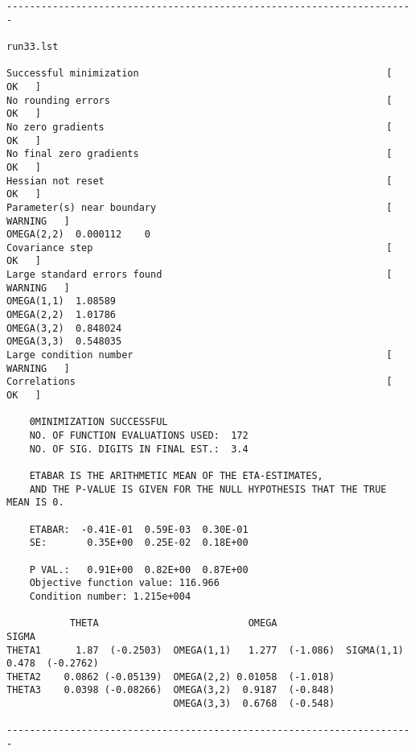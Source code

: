 \documentclass[a4paper,12pt]{article}
\begin{document}
\begin{verbatim}
-----------------------------------------------------------------------

run33.lst

Successful minimization                                           [    OK   ]   
No rounding errors                                                [    OK   ]   
No zero gradients                                                 [    OK   ]   
No final zero gradients                                           [    OK   ]   
Hessian not reset                                                 [    OK   ]   
Parameter(s) near boundary                                        [    WARNING   ]   
OMEGA(2,2)	0.000112	0
Covariance step                                                   [    OK   ]   
Large standard errors found                                       [    WARNING   ]   
OMEGA(1,1)	1.08589
OMEGA(2,2)	1.01786
OMEGA(3,2)	0.848024
OMEGA(3,3)	0.548035
Large condition number                                            [    WARNING   ]   
Correlations                                                      [    OK   ]

    0MINIMIZATION SUCCESSFUL
    NO. OF FUNCTION EVALUATIONS USED:  172
    NO. OF SIG. DIGITS IN FINAL EST.:  3.4

    ETABAR IS THE ARITHMETIC MEAN OF THE ETA-ESTIMATES,
    AND THE P-VALUE IS GIVEN FOR THE NULL HYPOTHESIS THAT THE TRUE MEAN IS 0.

    ETABAR:  -0.41E-01  0.59E-03  0.30E-01
    SE:       0.35E+00  0.25E-02  0.18E+00

    P VAL.:   0.91E+00  0.82E+00  0.87E+00
    Objective function value: 116.966
    Condition number: 1.215e+004

           THETA                          OMEGA                         SIGMA            
THETA1      1.87  (-0.2503)  OMEGA(1,1)   1.277  (-1.086)  SIGMA(1,1)   0.478  (-0.2762) 
THETA2    0.0862 (-0.05139)  OMEGA(2,2) 0.01058  (-1.018)                                
THETA3    0.0398 (-0.08266)  OMEGA(3,2)  0.9187  (-0.848)
                             OMEGA(3,3)  0.6768  (-0.548)

-----------------------------------------------------------------------
\end{verbatim}
\end{document}
